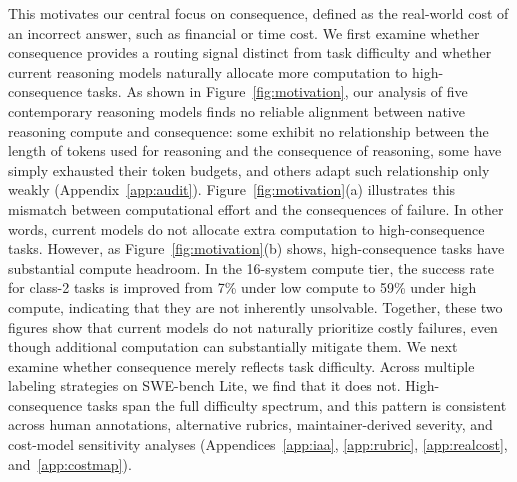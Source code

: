 \documentclass{article}
\begin{document}
This motivates our central focus on consequence, defined as the real-world cost of an incorrect answer, such as financial or time cost. We first examine whether consequence provides a routing signal distinct from task difficulty and whether current reasoning models naturally allocate more computation to high-consequence tasks.
As shown in Figure~\ref{fig:motivation}, our analysis of five contemporary reasoning models finds no reliable alignment between native reasoning compute and consequence: some exhibit no relationship between the length of tokens used for reasoning and the consequence of reasoning, some have simply exhausted their token budgets, and others adapt such relationship only weakly (Appendix~\ref{app:audit}). Figure~\ref{fig:motivation}(a) illustrates this mismatch between computational effort and the consequences of failure. In other words, current models do not allocate extra computation to high-consequence tasks.
However, as Figure~\ref{fig:motivation}(b) shows, high-consequence tasks have substantial compute headroom. In the 16-system compute tier, the success rate for class-2 tasks is improved from 7\% under low compute to 59\% under high compute, indicating that they are not inherently unsolvable. Together, these two figures show that current models do not naturally prioritize costly failures, even though additional computation can substantially mitigate them. We next examine whether consequence merely reflects task difficulty. Across multiple labeling strategies on SWE-bench Lite, we find that it does not. High-consequence tasks span the full difficulty spectrum, and this pattern is consistent across human annotations, alternative rubrics, maintainer-derived severity, and cost-model sensitivity analyses (Appendices~\ref{app:iaa}, \ref{app:rubric}, \ref{app:realcost}, and~\ref{app:costmap}).
\end{document}
